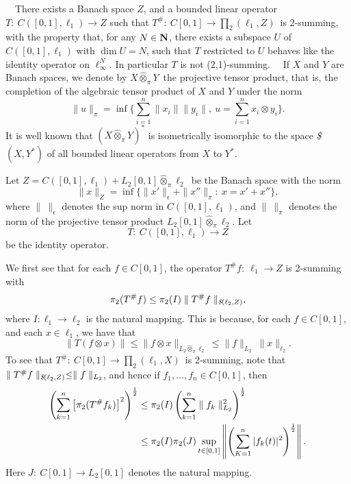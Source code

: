 \ \ There exists a Banach space $Z$, and a 
bounded
linear operator \hfill\break
$T:\ C\left([0,1], \ell_1\right)\rightarrow Z$ such that
$T^\#:\ C[0,1]\rightarrow \prod_2(\ell_1, Z)$\ is $2$-summing, with 
the
property that, for any $N\in \hbox{\bf N}$, there exists a subspace $U$ of 
$C\left([0,1],
\ell_1\right)$ with $\dim U=N$, such that $T$ restricted to $U$ 
behaves like
the identity operator on $\ell^N_\infty$.  In particular $T$ is not
(2,1)-summing. 
\bigskip 
{}\ \ If $X$ and $Y$ are Banach
spaces, we denote by $X \hat \otimes_\pi Y$\ the projective tensor 
product,
that is, the completion of the algebraic tensor product of $X$ and $Y$ 
under the
norm 
$$\parallel u\parallel_\pi=\inf\{\sum\limits^n_{i=1}\parallel x_i
\parallel \parallel y_i\parallel,\ u=\sum\limits^n_{i=1}x_i\otimes
y_i\}.
$$
It is well known that $(X\hat \otimes_\pi Y)^*$ is isometrically
isomorphic to the space {\it \$}$(X,Y^*)$ of all bounded linear
operators from $X$ to $Y^*$.  

\medskip

Let $Z=C\left([0,1],
\ell_1\right)+L_2[0,1]\hat \otimes_\pi \ell_2$\ be the Banach space 
with
the norm
$$
\parallel x\parallel_Z=\inf\{\parallel x'\parallel_\epsilon +\parallel
x''\parallel_\pi:\ x=x'+x''\},
$$
where $\parallel\ \parallel_\epsilon$ denotes the sup norm in
$C\left([0,1], \ell_1\right)$, and $\parallel\ \parallel_\pi$ denotes 
the
norm of the projective tensor product $L_2[0,1]\hat \otimes_\pi
\ell_2$.  Let
$$
T:\ C\left([0,1], \ell_1\right)\longrightarrow Z
$$
be the identity operator.  

\medskip

We first see that for each $f\in C[0,1]$, the operator $T^\#f:\
\ell_1\rightarrow Z$ is 2-summing with
$$
\pi_2(T^\#f)\leq \pi_2(I)\parallel T^\#f\parallel_{\text {\it
\$}(\ell_2,
Z)},
$$
where $I:\ell_1\longrightarrow \ell_2$ is the natural mapping.
This is because, for each $f\in C[0,1]$, and each $x\in
\ell_1$, we have that
$$
\parallel T(f\otimes x)\parallel \leq 
\parallel f\otimes x\parallel_{L_2\hat \otimes_\pi \ell_2} \leq
\parallel f\parallel_{L_2} \ 
\parallel x\parallel_{\ell_2}.
$$
To see that $T^\#:\ C[0,1]\longrightarrow
\prod_2(\ell_1, X)$\ is 2-summing, note that $\parallel 
T^\#f\parallel_{\text
{\it \$}(\ell_2, Z)}\leq \parallel f\parallel_{L_2}$, and hence if
$f_1, \ldots, f_n \in C[0,1]$, then
$$
\aligned
\left(\sum\limits^n_{k=1}\left[\pi_2(T^\#f_k)\right]^2\right)^{\frac
12}&\leq \pi_2(I) \left(\sum\limits^n_{k=1}\parallel
f_k\parallel^2_{L_2}\right)^{\frac 12}\\
&\leq \pi_2 (I) \pi_2(J) \sup\limits_{t\in [0,1]}\left\|
\left(\sum\limits^n_{K=1}|f_k(t)|^2\right)^{\frac
12}\right\|.\endaligned
$$
Here $J:\ C[0,1]\longrightarrow L_2[0,1]$ denotes the natural mapping.

